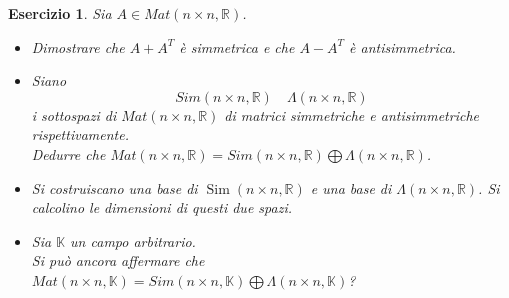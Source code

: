 \documentclass{article}
\newtheorem{es}{Esercizio}
\begin{document}
{\begin{es}
    Sia $A\in Mat(n \times n, \mathbb{R})$.
    \begin{itemize}
        \item Dimostrare che $A+A^T$ è simmetrica e che $A-A^T$ è antisimmetrica.
        \item Siano $$Sim(n\times n,\mathbb{R}) \quad \Lambda(n\times n,\mathbb{R})$$ i sottospazi di $Mat (n \times n, \mathbb{R})$ di matrici simmetriche e antisimmetriche rispettivamente. \\
        Dedurre che $Mat (n \times n, \mathbb{R})=Sim(n\times n,\mathbb{R})\bigoplus \Lambda(n\times n,\mathbb{R})$. 
       \item Si costruiscano una base di $\operatorname{Sim}(n\times n,\mathbb{R})$ e una base di $\Lambda(n\times n,\mathbb{R})$. Si calcolino le dimensioni di questi due spazi.
       \item Sia $\mathbb{K}$ un campo arbitrario. \\Si può ancora affermare che $Mat (n \times n, \mathbb{K})=Sim(n\times n,\mathbb{K})\bigoplus \Lambda(n\times n,\mathbb{K})$?
    \end{itemize}
\end{es}

}
\end{document}
